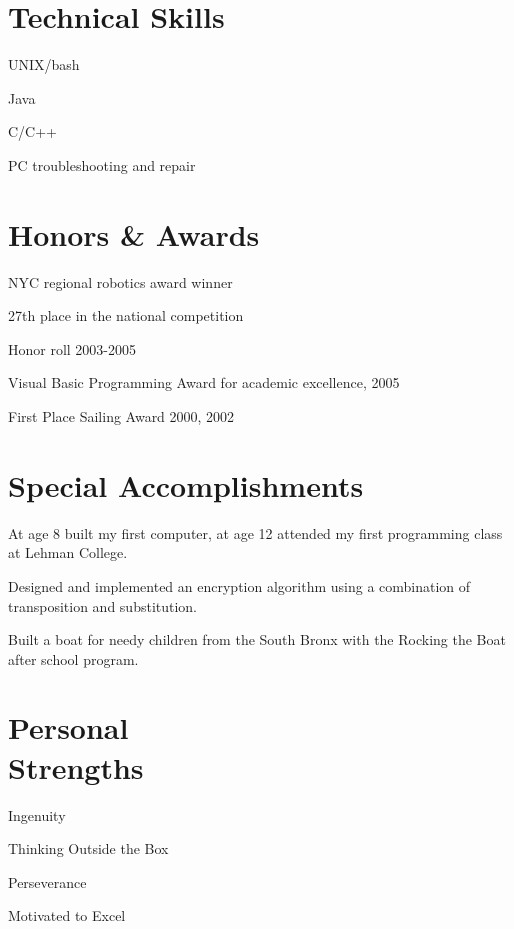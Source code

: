\documentclass[margin,line]{resume}
\begin{document}
\begin{resume}
\section{\mysidestyle Technical Skills}
	\begin{asparablank}
		\item UNIX/bash
		\item Java
		\item C/C++
		\item PC troubleshooting and repair
	 \end{asparablank}

\section{\mysidestyle Honors \& Awards}
	\begin{asparablank}
		\item NYC regional robotics award winner
		\begin{compactitem}
			\item {\small 27th place in the national competition}
		\end{compactitem}
		\item Honor roll 2003-2005
		\item Visual Basic Programming Award for academic excellence, 2005
		\item First Place Sailing Award 2000, 2002
	\end{asparablank}

\section{\mysidestyle Special Accomplishments}
	\begin{asparablank}
		\item At age 8 built my first computer, at age 12 attended my first
		programming class at Lehman College.
		\item Designed and implemented an encryption algorithm using a
		combination of transposition and substitution.
		\item Built a boat for needy children from the South Bronx with the
		Rocking the Boat after school program.
	\end{asparablank}

\section{\mysidestyle Personal \\ Strengths}
	\begin{asparablank}
		\item Ingenuity
		\item Thinking Outside the Box
		\item Perseverance
		\item Motivated to Excel
	\end{asparablank}


\end{resume}
\end{document}
